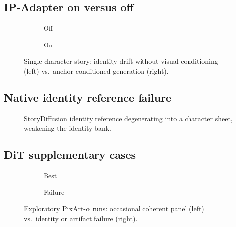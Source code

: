 \subsection{IP-Adapter on versus off}

\begin{figure}[!h]
  \centering
  \begin{subfigure}{0.48\columnwidth}
    \caption{Off}
  \end{subfigure}
  \hfill
  \begin{subfigure}{0.48\columnwidth}
    \caption{On}
  \end{subfigure}
  \caption{Single-character story: identity drift without visual conditioning (left) vs.\ anchor-conditioned generation (right).}
\end{figure}

\subsection{Native identity reference failure}

\begin{figure}[!h]
  \centering
  \caption{StoryDiffusion identity reference degenerating into a character sheet, weakening the identity bank.}
  \label{fig:identity_sheet}
\end{figure}

\subsection{DiT supplementary cases}

\begin{figure}[!h]
  \centering
  \begin{subfigure}{0.48\columnwidth}
    \caption{Best}
  \end{subfigure}
  \hfill
  \begin{subfigure}{0.48\columnwidth}
    \caption{Failure}
  \end{subfigure}
  \caption{Exploratory PixArt-$\alpha$ runs: occasional coherent panel (left) vs.\ identity or artifact failure (right).}
\end{figure}

